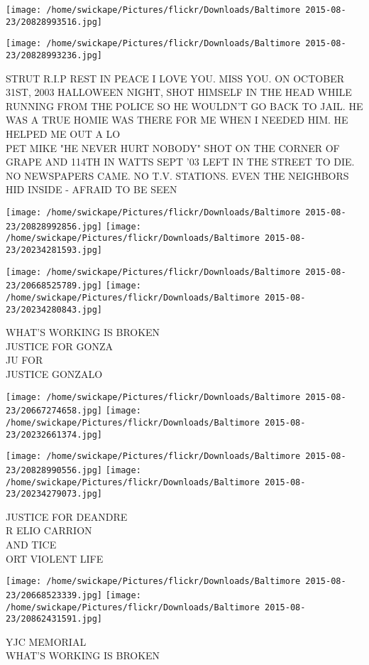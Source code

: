 \documentclass[10pt,letterpaper]{article}
\begin{document}
\texttt{[image: /home/swickape/Pictures/flickr/Downloads/Baltimore 2015-08-23/20828993516.jpg]}

\vspace{0.25in}
\texttt{[image: /home/swickape/Pictures/flickr/Downloads/Baltimore 2015-08-23/20828993236.jpg]}

STRUT R.I.P REST IN PEACE I LOVE YOU.  MISS YOU.  ON OCTOBER 31ST, 2003 HALLOWEEN NIGHT, SHOT HIMSELF IN THE HEAD WHILE RUNNING FROM THE POLICE SO HE WOULDN'T GO BACK TO JAIL.  HE WAS A TRUE HOMIE WAS THERE FOR ME WHEN I NEEDED HIM.  HE HELPED ME OUT A LO\\
PET MIKE "HE NEVER HURT NOBODY" SHOT ON THE CORNER OF GRAPE AND 114TH IN WATTS SEPT '03 LEFT IN THE STREET TO DIE.  NO NEWSPAPERS CAME.  NO T.V. STATIONS.  EVEN THE NEIGHBORS HID INSIDE {-} AFRAID TO BE SEEN
\pagebreak

\texttt{[image: /home/swickape/Pictures/flickr/Downloads/Baltimore 2015-08-23/20828992856.jpg]}
\texttt{[image: /home/swickape/Pictures/flickr/Downloads/Baltimore 2015-08-23/20234281593.jpg]}

\texttt{[image: /home/swickape/Pictures/flickr/Downloads/Baltimore 2015-08-23/20668525789.jpg]}
\texttt{[image: /home/swickape/Pictures/flickr/Downloads/Baltimore 2015-08-23/20234280843.jpg]}

WHAT'S WORKING IS BROKEN\\
JUSTICE FOR GONZA\\
JU FOR\\
JUSTICE GONZALO
\pagebreak

\texttt{[image: /home/swickape/Pictures/flickr/Downloads/Baltimore 2015-08-23/20667274658.jpg]}
\texttt{[image: /home/swickape/Pictures/flickr/Downloads/Baltimore 2015-08-23/20232661374.jpg]}

\texttt{[image: /home/swickape/Pictures/flickr/Downloads/Baltimore 2015-08-23/20828990556.jpg]}
\texttt{[image: /home/swickape/Pictures/flickr/Downloads/Baltimore 2015-08-23/20234279073.jpg]}

JUSTICE FOR DEANDRE\\
R ELIO CARRION\\
AND TICE\\
ORT VIOLENT LIFE
\pagebreak

\texttt{[image: /home/swickape/Pictures/flickr/Downloads/Baltimore 2015-08-23/20668523339.jpg]}
\texttt{[image: /home/swickape/Pictures/flickr/Downloads/Baltimore 2015-08-23/20862431591.jpg]}

YJC MEMORIAL\\
WHAT'S WORKING IS BROKEN
\pagebreak
\end{document}
